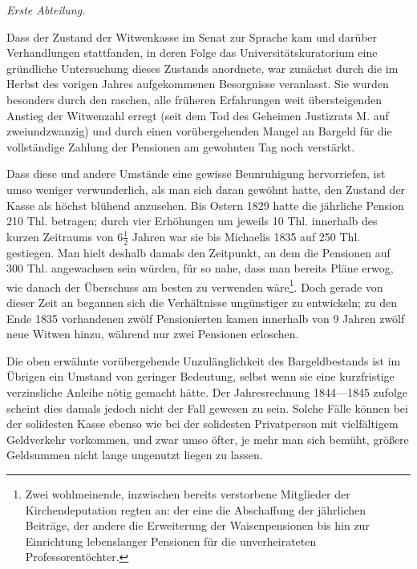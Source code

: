\begin{center}\textit{Erste Abteilung.}\end{center}
\noindent\hspace*{\parindent}Dass der Zustand der Witwenkasse im Senat zur Sprache kam und darüber Verhandlungen stattfanden, in deren Folge das Universitätskuratorium eine gründliche Untersuchung dieses Zustands anordnete, war zunächst durch die im Herbst des vorigen Jahres aufgekommenen Besorgnisse veranlasst. Sie wurden besonders durch den raschen, alle früheren Erfahrungen weit übersteigenden Anstieg der Witwenzahl erregt (seit dem Tod des Geheimen Justizrats M. auf zweiundzwanzig) und durch einen vorübergehenden Mangel an Bargeld für die vollständige Zahlung der Pensionen am gewohnten Tag noch verstärkt.

Dass diese und andere Umstände eine gewisse Beunruhigung hervorriefen, ist umso weniger verwunderlich, als man sich daran gewöhnt hatte, den Zustand der Kasse als höchst blühend anzusehen. Bis Ostern 1829 hatte die jährliche Pension 210 Thl. betragen; durch vier Erhöhungen um jeweils 10 Thl. innerhalb des kurzen Zeitraums von \(6\tfrac12\) Jahren war sie bis Michaelis 1835 auf 250 Thl. gestiegen. Man hielt deshalb damals den Zeitpunkt, an dem die Pensionen auf 300 Thl. angewachsen sein würden, für so nahe, dass man bereits Pläne erwog, wie danach der Überschuss am besten zu verwenden wäre\footnote{Zwei wohlmeinende, inzwischen bereits verstorbene Mitglieder der Kirchendeputation regten an: der eine die Abschaffung der jährlichen Beiträge, der andere die Erweiterung der Waisenpensionen bis hin zur Einrichtung lebenslanger Pensionen für die unverheirateten Professorentöchter.}. Doch gerade von dieser Zeit an begannen sich die Verhältnisse ungünstiger zu entwickeln; zu den Ende 1835 vorhandenen zwölf Pensionierten kamen innerhalb von 9 Jahren zwölf neue Witwen hinzu, während nur zwei Pensionen erloschen.

Die oben erwähnte vorübergehende Unzulänglichkeit des Bargeldbestands ist im Übrigen ein Umstand von geringer Bedeutung, selbst wenn sie eine kurzfristige verzinsliche Anleihe nötig gemacht hätte. Der Jahresrechnung 1844—1845 zufolge scheint dies damals jedoch nicht der Fall gewesen zu sein. Solche Fälle können bei der solidesten Kasse ebenso wie bei der solidesten Privatperson mit vielfältigem Geldverkehr vorkommen, und zwar umso öfter, je mehr man sich bemüht, größere Geldsummen nicht lange ungenutzt liegen zu lassen.

